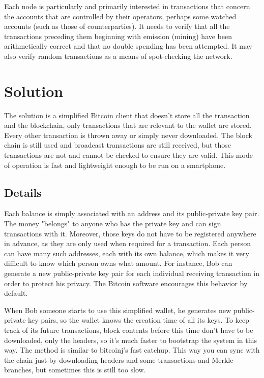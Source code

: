 \documentclass[a4paper,12pt]{article}
\begin{document}
Each node is particularly and primarily interested in transactions that concern the
accounts that are controlled by their operators, perhaps some watched accounts (such
as those of counterparties). It needs to verify that all the transactions preceding them
beginning with emission (mining) have been arithmetically correct and that no double
spending has been attempted. It may also verify random transactions as a means of
spot-checking the network.

\newpage

\section{Solution}
The solution is a simplified Bitcoin client that doesn't store all the transaction and the blockchain, only transactions that are relevant to the wallet are stored. Every other transaction is thrown away or simply never downloaded. The block chain is still used and broadcast transactions are still received, but those transactions are not and cannot be checked to ensure they are valid. This mode of operation is fast and lightweight enough to be run on a smartphone.


\subsection{Details}
Each balance is simply associated with an address and its public-private key pair. The money "belongs" to anyone who has the private key and can sign transactions with it. Moreover, those keys do not have to be registered anywhere in advance, as they are only used when required for a transaction. Each person can have many such addresses, each with its own balance, which makes it very difficult to know which person owns what amount. For instance, Bob can generate a new public-private key pair for each individual receiving transaction in order to protect his privacy. The Bitcoin software encourages this behavior by default.

When Bob someone starts to use this simplified wallet, he generates new public-private key pairs, so the wallet knows the creation time of all its keys. To keep track of its future transactions, block contents before this time don't have to be downloaded, only the headers, so it's much faster to bootstrap the system in this way. The method is similar to bitcoinj's fast catchup. This way you can sync with the chain just by downloading headers and some transactions and Merkle branches, but sometimes this is still too slow. 
\end{document}
